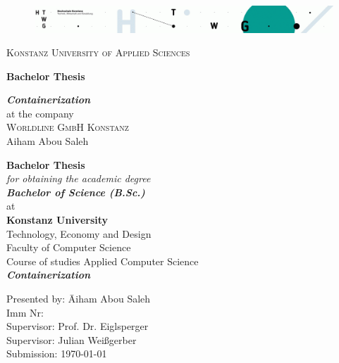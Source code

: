 
\begin{titlepage}
\vspace*{15mm}
\begin{figure}[h]
\centering
\includegraphics[width=\textwidth]{fig/ain}
\label{fig:unilogo}
\end{figure}
{
\center
{\LARGE \textsc{Konstanz University of Applied Sciences}}\\
\vspace*{10mm}

\textbf{{\Large Bachelor Thesis}}\\
\vspace*{40mm}

\textbf{{\Large \textit{Containerization}}}\\ \vspace*{5mm}
{at the company }\\
\vspace*{10mm}
{\Large \textsc{Worldline GmbH Konstanz}}\\
\vspace*{15mm}
{\Large Aiham Abou Saleh}

}


\newpage
\thispagestyle{empty}

{
\center
\vspace*{15mm}
{\Huge \textbf{Bachelor Thesis}}\\ \vspace*{5mm}
\emph{for obtaining the academic degree \\ \vspace*{5mm}
{\LARGE \textbf{Bachelor of Science (B.Sc.)}} }\\
\vspace*{10mm}
{at}\\
\vspace*{10mm}
{\large \textbf{Konstanz University}}\\ \vspace*{5mm}
{Technology, Economy and Design \\ \vspace*{1mm} Faculty of Computer Science  \\ \vspace*{1mm} 
Course of studies Applied Computer Science}\\ \vspace*{10mm}
{\LARGE \textbf{\textit{Containerization}}} 

}
\vspace*{20mm}
\begin{tabbing}
\hspace*{4cm}Presented by: \hspace*{0.5cm}\= Aiham Abou Saleh \\
\hspace*{4cm}Imm Nr:  \\
\hspace*{4cm}Supervisor: \> Prof. Dr. Eiglsperger\\
\hspace*{4cm}Supervisor: \> Julian Weißgerber\\
\hspace*{4cm}Submission: \> \today
\end{tabbing}
\end{titlepage}